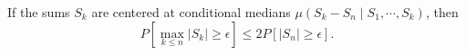 If the sums $S_k$ are centered at conditional medians $\mu(S_k - S_n \mid S_1, \cdots, S_k)$, then $$P[\max_{k \leq n} |S_k| \geq \epsilon] \leq 2P[|S_n| \geq \epsilon].$$
